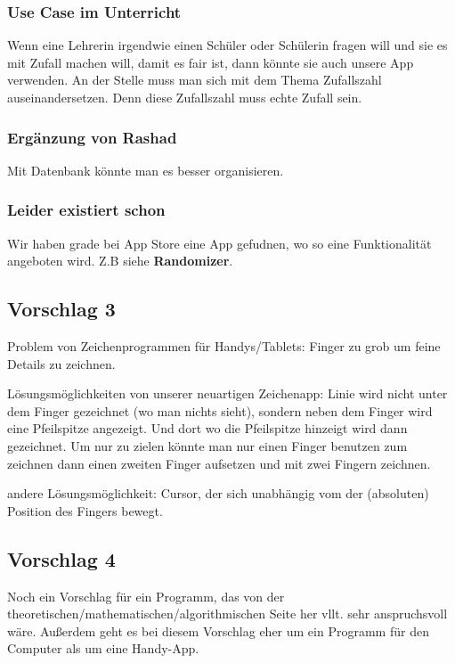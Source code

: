 \subsubsection{Use Case im Unterricht}
Wenn eine Lehrerin irgendwie einen Schüler oder Schülerin fragen will und sie es mit Zufall machen will, damit es fair ist, dann könnte sie auch unsere App verwenden. An der Stelle muss man sich mit dem Thema Zufallszahl auseinandersetzen. Denn diese Zufallszahl muss echte Zufall sein. 


\subsubsection{Ergänzung von Rashad}
Mit Datenbank könnte man es besser organisieren. 


\subsubsection{Leider existiert schon}
Wir haben grade bei App Store eine App gefudnen, wo so eine Funktionalität angeboten wird. Z.B siehe \textbf{Randomizer}. 



\subsection{Vorschlag 3}

Problem von Zeichenprogrammen für Handys/Tablets: Finger zu grob um feine Details zu zeichnen. 

Lösungsmöglichkeiten von unserer neuartigen Zeichenapp:
Linie wird nicht unter dem Finger gezeichnet (wo man nichts sieht), sondern neben dem Finger wird eine Pfeilspitze angezeigt. Und dort wo die Pfeilspitze hinzeigt wird dann gezeichnet.
Um nur zu zielen könnte man nur einen Finger benutzen zum zeichnen dann einen zweiten Finger aufsetzen und mit zwei Fingern zeichnen.

andere Lösungsmöglichkeit:
Cursor, der sich unabhängig vom der (absoluten) Position des Fingers bewegt.

\subsection{Vorschlag 4}

Noch ein Vorschlag für ein Programm, das von der theoretischen/mathematischen/algorithmischen Seite her vllt. sehr anspruchsvoll wäre.
Außerdem geht es bei diesem Vorschlag eher um ein Programm für den Computer als um eine Handy-App.

